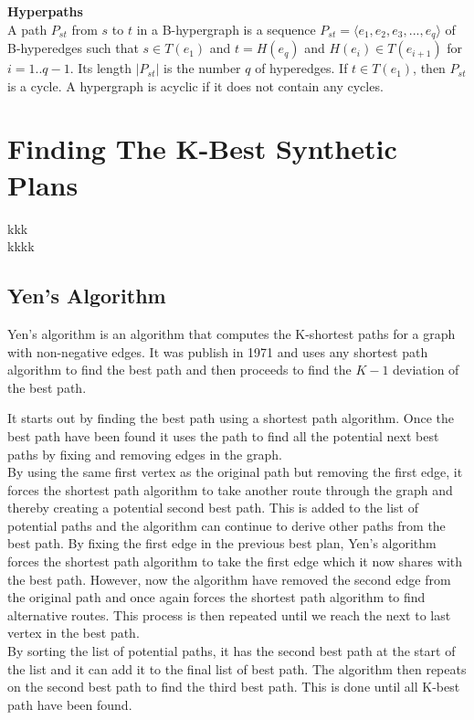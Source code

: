 \documentclass[a4paper,10pt,titlepage]{paper}
\begin{document}
\textbf{Hyperpaths}\\
A path $P_{st}$ from $s$ to $t$ in a B-hypergraph is a sequence $P_{st}=\langle e_1, e_2, e_3, ... , e_q \rangle$ of B-hyperedges such that $s\in T(e_1)$ and $t=H(e_q)$ and $H(e_i) \in T(e_{i+1})$ for $i=1..q-1$. Its length $|P_{st}|$ is the number $q$ of hyperedges. If $t \in T(e_1)$, then $P_{st}$ is a cycle. A hypergraph is acyclic if it does not contain any cycles. \cite{Fagerberg}

\section{Finding The K-Best Synthetic Plans}
kkk \cite{Carsten}\\
kkkk \cite{Fagerberg}\\
\subsection{Yen's Algorithm}
Yen's algorithm is an algorithm that computes the K-shortest paths for a graph with non-negative edges. It was publish in 1971 and uses any shortest path algorithm to find the best path and then proceeds to find the $K-1$ deviation of the best path.

It starts out by finding the best path using a shortest path algorithm. Once the best path have been found it uses the path to find all the potential next best paths by fixing and removing edges in the graph. \\
By using the same first vertex as the original path but removing the first edge, it forces the shortest path algorithm to take another route through the graph and thereby creating a potential second best path. This is added to the list of potential paths and the algorithm can continue to derive other paths from the best path. By fixing the first edge in the previous best plan, Yen's algorithm forces the shortest path algorithm to take the first edge which it now shares with the best path. However, now the algorithm have removed the second edge from the original path and once again forces the shortest path algorithm to find alternative routes. This process is then repeated until we reach the next to last vertex in the best path.\\
By sorting the list of potential paths, it has the second best path at the start of the list and it can add it to the final list of best path. The algorithm then repeats on the second best path to find the third best path. This is done until all K-best path have been found. \\
\end{document}
